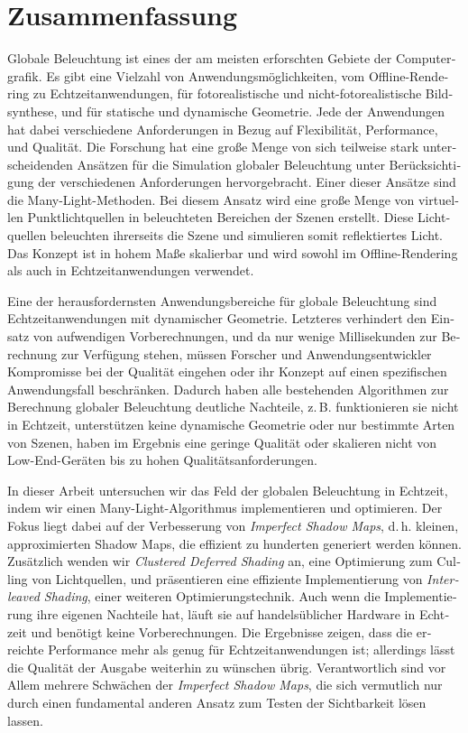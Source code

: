 \chapter*{Zusammenfassung}

\begin{otherlanguage}{ngerman}

Globale Beleuchtung ist eines der am meisten erforschten Gebiete der Computergrafik. Es gibt eine Vielzahl von Anwendungsmöglichkeiten, vom Offline-Rendering zu Echtzeitanwendungen, für fotorealistische und nicht-fotorealistische Bildsynthese, und für statische und dynamische Geometrie. Jede der Anwendungen hat dabei verschiedene Anforderungen in Bezug auf Flexibilität, Performance, und Qualität. Die Forschung hat eine große Menge von sich teilweise stark unterscheidenden Ansätzen für die Simulation globaler Beleuchtung unter Berücksichtigung der verschiedenen Anforderungen hervorgebracht. Einer dieser Ansätze sind die Many-Light-Methoden. Bei diesem Ansatz wird eine große Menge von virtuellen Punktlichtquellen in beleuchteten Bereichen der Szenen erstellt. Diese Lichtquellen beleuchten ihrerseits die Szene und simulieren somit reflektiertes Licht. Das Konzept ist in hohem Maße skalierbar und wird sowohl im Offline-Rendering als auch in Echtzeitanwendungen verwendet.

Eine der herausfordernsten Anwendungsbereiche für globale Beleuchtung sind Echtzeitanwendungen mit dynamischer Geometrie. Letzteres verhindert den Einsatz von aufwendigen Vorberechnungen, und da nur wenige Millisekunden zur Berechnung zur Verfügung stehen, müssen Forscher und Anwendungsentwickler Kompromisse bei der Qualität eingehen oder ihr Konzept auf einen spezifischen Anwendungsfall beschränken. Dadurch haben alle bestehenden Algorithmen zur Berechnung globaler Beleuchtung deutliche Nachteile, z.\,B. funktionieren sie nicht in Echtzeit, unterstützen keine dynamische Geometrie oder nur bestimmte Arten von Szenen, haben im Ergebnis eine geringe Qualität oder skalieren nicht von Low-End-Geräten bis zu hohen Qualitätsanforderungen.

In dieser Arbeit untersuchen wir das Feld der globalen Beleuchtung in Echtzeit, indem wir einen Many-Light-Algorithmus implementieren und optimieren. Der Fokus liegt dabei auf der Verbesserung von \textit{Imperfect Shadow Maps}, d.\,h. kleinen, approximierten Shadow Maps, die effizient zu hunderten generiert werden können. Zusätzlich wenden wir \textit{Clustered Deferred Shading} an, eine Optimierung zum Culling von Lichtquellen, und präsentieren eine effiziente Implementierung von \textit{Interleaved Shading}, einer weiteren Optimierungstechnik. Auch wenn die Implementierung ihre eigenen Nachteile hat, läuft sie auf handelsüblicher Hardware in Echtzeit und benötigt keine Vorberechnungen. Die Ergebnisse zeigen, dass die erreichte Performance mehr als genug für Echtzeitanwendungen ist; allerdings lässt die Qualität der Ausgabe weiterhin zu wünschen übrig. Verantwortlich sind vor Allem mehrere Schwächen der \textit{Imperfect Shadow Maps}, die sich vermutlich nur durch einen fundamental anderen Ansatz zum Testen der Sichtbarkeit lösen lassen.

\end{otherlanguage}

\cleardoublepage
